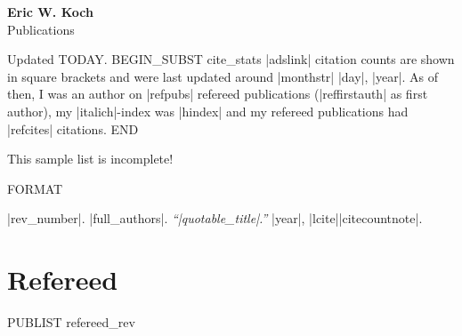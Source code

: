 \documentclass[letterpaper,11pt]{article}
\newcommand{\myname}{Eric W. Koch}
\newcommand{\mysite}{e-koch.github.io}
\newenvironment{publist}{
  \begingroup
  \raggedright
  \begin{description}[leftmargin=4ex,style=sameline]
}{
  \end{description}
  \endgroup
}
\begin{document}
\pagestyle{fancy}
\lhead{} \chead{} \rhead{} \renewcommand{\headrule}{\relax}
\cfoot{\thepage/\pageref*{LastPage}}
\rfoot{\textsc{\myname}}

\begin{center}
\textbf{\Large \myname} \\
{\large Publications}
\end{center}



\noindent Updated %
TODAY.
BEGIN_SUBST cite_stats
|adslink| citation counts are shown in square brackets and were last updated
around |monthstr| |day|, |year|. As of then, I was an author on |refpubs|
refereed publications (|reffirstauth| as first author), my |italich|-index was
|hindex| and my refereed publications had |refcites| citations.
END

This sample list is incomplete!

FORMAT \item[|rev_number|.] |full_authors|. \textit{``|quotable_title|.''} |year|, |lcite||citecountnote|.



\section*{Refereed}

\begin{publist}
PUBLIST refereed_rev
\end{publist}


\end{document}
